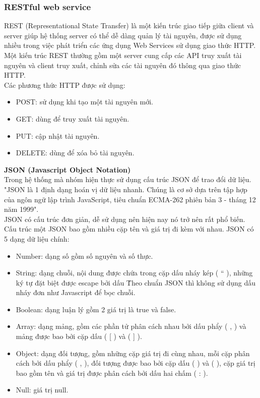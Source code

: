 \documentclass[a4paper,12pt,oneside]{article}
\begin{document}
\subsubsection{RESTful web service \cite{restful}}
\noindent REST (Representational State Transfer) là một kiến trúc giao tiếp giữa client và server giúp hệ thống server có thể dễ dàng quản lý tài nguyên, được sử dụng nhiều trong việc phát triển các ứng dụng Web Services sử dụng giao thức HTTP.\\
\noindent Một kiến trúc REST thường gồm một server cung cấp các API truy xuất tài nguyên và client truy xuất, chỉnh sửa các tài nguyên đó thông qua giao thức HTTP.\\
Các phương thức HTTP được sử dụng:
\begin{itemize}
\item POST: sử dụng khi tạo một tài nguyên mới.
\item GET: dùng để truy xuất tài nguyên.
\item PUT: cập nhật tài nguyên.
\item DELETE: dùng để xóa bỏ tài nguyên.
\end{itemize}
\textbf{JSON (Javascript Object Notation)}\\
 Trong hệ thống mà nhóm hiện thực sử dụng cấu trúc JSON để trao đổi dữ liệu. "JSON là 1 định dạng hoán vị dữ liệu nhanh. Chúng là cơ sở dựa trên tập hợp của ngôn ngữ lập trình JavaScript, tiêu chuẩn ECMA-262 phiên bản 3 - tháng 12 năm 1999"\cite{json}.\\
 JSON có cấu trúc đơn giản, dễ sử dụng nên hiện nay nó trở nên rất phổ biến. Cấu trúc một JSON bao gồm nhiều cặp tên và giá trị đi kèm với nhau.
 JSON có 5 dạng dữ liệu chính:
\begin{itemize}
	\item Number: dạng số gồm số nguyên và số thực.
	\item String: dạng chuỗi, nội dung được chứa trong cặp dấu nháy kép ( “ ), những ký tự đặt biệt được escape bởi dấu \.Theo chuẩn JSON thì không sử dụng dấu nháy đơn như Javascript để bọc chuỗi.
	\item Boolean: dạng luận lý gồm 2 giá trị là true và false.
	\item Array: dạng mảng, gồm các phần tử phân cách nhau bởi dấu phẩy ( , ) và mảng được bao bởi cặp dấu ( [ ) và ( ] ).
	\item Object: dạng đối tượng, gồm những cặp giá trị đi cùng nhau, mỗi cặp phân cách bởi dấu phẩy ( , ), đối tượng được bao bởi cặp dấu ( { ) và ( } ), cặp giá trị bao gồm tên và giá trị được phân cách bởi dấu hai chấm ( : ).
	\item Null: giá trị null.
\end{itemize}
\end{document}
